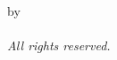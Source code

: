 %
\begin{flushleft}
    \singlespacing
    \vspace*{3in} %
    
    {\small \textcopyright{} \yourYear{} by \yourName}\\
    {}\\[0.25cm]
    {\small \textit{All rights reserved.}}
    
\end{flushleft}
